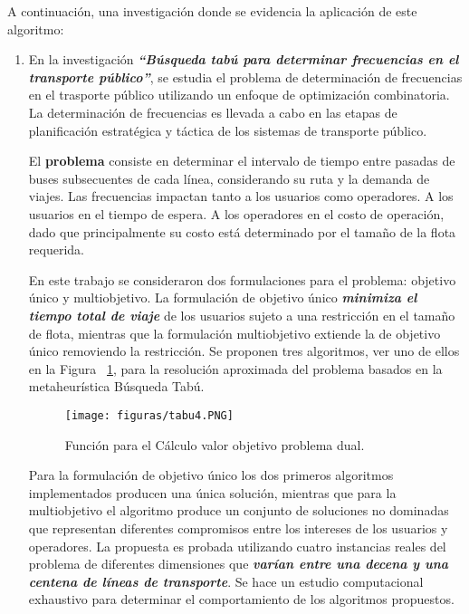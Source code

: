 \documentclass[10pt,conference]{IEEEtran}
\begin{document}
A continuación, una investigación donde se evidencia la aplicación de este algoritmo:
\begin{enumerate}
\item En la investigación \textit{\textbf{“Búsqueda tabú para determinar
frecuencias en el transporte público”}}, \citep{martinez} se estudia el problema de determinación de frecuencias en el trasporte público utilizando un enfoque de optimización combinatoria. La determinación de frecuencias es llevada a cabo en las etapas de planificación estratégica y táctica de los sistemas de transporte público.

El \textbf{problema} consiste en determinar el intervalo de tiempo entre pasadas de buses subsecuentes de cada línea, considerando su ruta y la demanda de viajes. Las frecuencias impactan tanto a los usuarios como operadores. A los usuarios en el tiempo de espera. A los operadores en el costo de operación, dado que principalmente su costo está determinado por el tamaño de la flota requerida.

En este trabajo se consideraron dos formulaciones para el problema: objetivo único y multiobjetivo. La formulación de objetivo único \textbf{\textit{minimiza el tiempo total de viaje}} de los usuarios sujeto a una restricción en el tamaño de flota, mientras que la formulación multiobjetivo extiende la de objetivo único removiendo la restricción. Se proponen tres algoritmos, ver uno de ellos en la Figura ~\ref{tabu4}, para la resolución aproximada del problema basados en la metaheurística Búsqueda Tabú.

\begin{figure}[H]
\begin{center}
\texttt{[image: figuras/tabu4.PNG]}
\caption{Función para el Cálculo valor objetivo problema dual.}
\label{tabu4} 
\end{center}
\end{figure}

Para la formulación de objetivo único los dos primeros algoritmos implementados producen una única solución, mientras que para la multiobjetivo el algoritmo produce un conjunto de soluciones no dominadas que representan diferentes compromisos entre los intereses de los usuarios y operadores. La propuesta es probada utilizando cuatro instancias reales del problema de diferentes dimensiones que \textbf{\textit{varían entre una decena y una centena de líneas de transporte}}. Se hace un estudio computacional exhaustivo para determinar el comportamiento de los algoritmos propuestos.


\end{enumerate}
\end{document}
